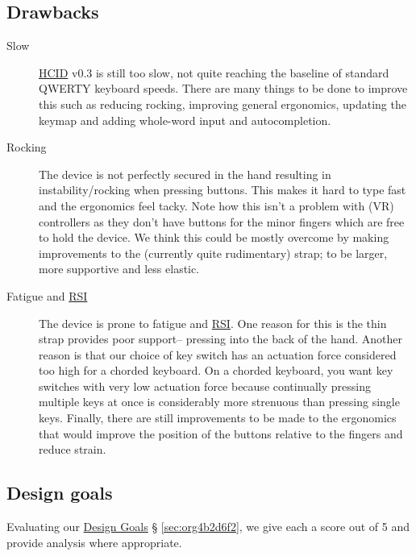 \documentclass[logo,bsc,singlespacing,parskip]{infthesis}
\begin{document}
\subsection{Drawbacks}
\label{sec:orge0cecec}
\begin{description}
\item[{Slow}] \hyperref[org917851e]{HCID} v0.3 is still too slow, not quite reaching the baseline of standard QWERTY keyboard speeds.
There are many things to be done to improve this such as reducing rocking, improving general ergonomics, updating the keymap and adding whole-word input and autocompletion.

\item[{Rocking}] The device is not perfectly secured in the hand resulting in instability/rocking when pressing buttons.
This makes it hard to type fast and the ergonomics feel tacky.
Note how this isn't a problem with (VR) controllers as they don't have buttons for the minor fingers which are free to hold the device.
We think this could be mostly overcome by making improvements to the (currently quite rudimentary) strap; to be larger, more supportive and less elastic.

\item[{Fatigue and \hyperref[orgafdb7af]{RSI}}] The device is prone to fatigue and \hyperref[orgafdb7af]{RSI}.
One reason for this is the thin strap provides poor support-- pressing into the back of the hand.
Another reason is that our choice of key switch has an actuation force considered too high for a chorded keyboard.
On a chorded keyboard, you want key switches with very low actuation force because continually pressing multiple keys at once is considerably more strenuous than pressing single keys.
Finally, there are still improvements to be made to the ergonomics that would improve the position of the buttons relative to the fingers and reduce strain.
\end{description}
\subsection{Design goals}
\label{sec:orgd881ab4}
Evaluating our \hyperref[sec:org4b2d6f2]{Design Goals} § \ref{sec:org4b2d6f2}, we give each a score out of 5 and provide analysis where appropriate. \smallskip
\end{document}
